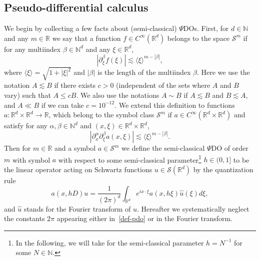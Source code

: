 \documentclass[10pt]{amsart}
\theoremstyle{definition}\newtheorem{defi}[theo]{Definition}\newtheorem{rema}[theo]{Remark}\newtheorem{exam}[theo]{Example}\newtheorem{exem}[theo]{Example}\newtheorem{nota}[theo]{Notation}
\newcommand{\R}{\mathbb{R}}
\newcommand{\N}{\mathbb{N}}
\renewcommand{\S}{\mathcal{S}}
\newcommand{\les}{\lesssim}
\newcommand{\jb}[1] {\langle #1 \rangle}
\begin{document}
\subsection{Pseudo-differential calculus}
We begin by collecting a few facts about (semi-classical) $\Psi$DOs. First, for $d\in\N$ and any $m\in\R$ we say that a function $f\in C^{\infty}(\R^d)$ belongs to the space $\S^m$ if for any multiindex $\beta\in\N^d$ and any $\xi\in\R^d$,
\begin{equation}\label{def-Sm}
\left|\partial_{\xi}^{\beta}f(\xi)\right|\les \jb{\xi}^{m-|\beta|},
\end{equation}
where $\jb{\xi}=\sqrt{1+|\xi|^2}$ and $|\beta|$ is the length of the multiindex $\beta$. Here we use the notation $A\les B$ if there exists $c>0$ (independent of the sets where $A$ and $B$ vary) such that $A\leq cB$. We also use the notations $A\sim B$ if $A\les B$ and $B\les A$, and $A\ll B$ if we can take $c=10^{-12}$. We extend this definition to functions $a: \R^d\times\R^d \rightarrow \R$, which belong to the symbol class $\S^m$ if $a \in C^{\infty}(\R^d\times\R^d)$ and satisfy for any $\alpha,\beta\in\N^d$ and $(x,\xi)\in\R^d\times\R^d$,
\begin{equation}\label{def-symbolclass}
\left|\partial_x^{\alpha}\partial_{\xi}^{\beta}a(x,\xi)\right|\les \jb{\xi}^{m-|\beta|}.
\end{equation}
Then for $m\in\R$ and a symbol $a\in\S^m$ we define the semi-classical $\Psi$DO of order $m$ with symbol $a$ with respect to some semi-classical parameter\footnote{ In the following, we will take for the semi-classical parameter $h=N^{-1}$ for some $N\in\N$. } $h\in (0,1]$ to be the linear operator acting on Schwartz functions $u\in \S(\R^d)$ by the quantization rule
\begin{equation}\label{def-pdo}
a(x,hD)u=\frac{1}{(2\pi)^d}\int_{\R^d}e^{ix\cdot\xi}a(x,h\xi)\widehat{u}(\xi)d\xi,
\end{equation}
and $\widehat{u}$ stands for the Fourier transform of $u$. Hereafter we systematically neglect the constants $2\pi$ appearing either in~\eqref{def-pdo} or in the Fourier transform.
\end{document}

